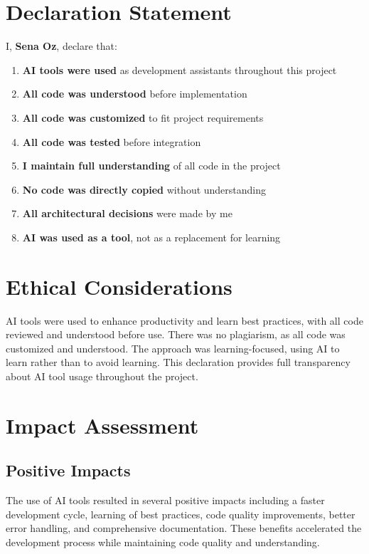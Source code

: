 \documentclass[12pt,a4paper]{report}
\begin{document}
\section{Declaration Statement}

I, \textbf{Sena Oz}, declare that:

\begin{enumerate}
    \item \textbf{AI tools were used} as development assistants throughout this project
    \item \textbf{All code was understood} before implementation
    \item \textbf{All code was customized} to fit project requirements
    \item \textbf{All code was tested} before integration
    \item \textbf{I maintain full understanding} of all code in the project
    \item \textbf{No code was directly copied} without understanding
    \item \textbf{All architectural decisions} were made by me
    \item \textbf{AI was used as a tool}, not as a replacement for learning
\end{enumerate}

\section{Ethical Considerations}

AI tools were used to enhance productivity and learn best practices, with all code reviewed and understood before use. There was no plagiarism, as all code was customized and understood. The approach was learning-focused, using AI to learn rather than to avoid learning. This declaration provides full transparency about AI tool usage throughout the project.

\section{Impact Assessment}

\subsection{Positive Impacts}

The use of AI tools resulted in several positive impacts including a faster development cycle, learning of best practices, code quality improvements, better error handling, and comprehensive documentation. These benefits accelerated the development process while maintaining code quality and understanding.
\end{document}
